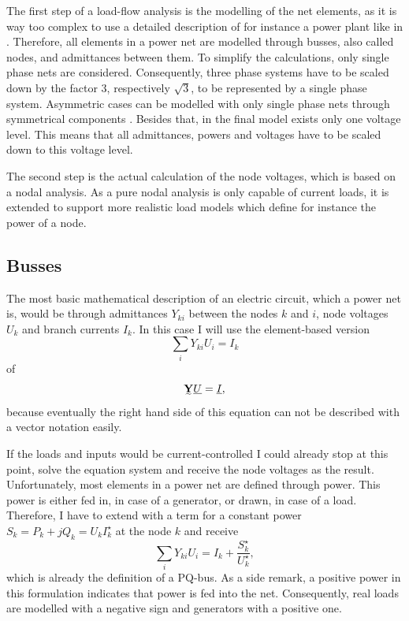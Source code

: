 The first step of a load-flow analysis is the modelling of the net elements, as it is way too complex to use a detailed description of for instance a power plant like in . Therefore, all elements in a power net are modelled through busses, also called nodes, and admittances between them. To simplify the calculations, only single phase nets are considered. Consequently, three phase systems have to be scaled down by the factor 3, respectively $\sqrt{3}$, to be represented by a single phase system. Asymmetric cases can be modelled with only single phase nets through symmetrical components \citep[p. 399]{powerSystemAnalysis}. Besides that, in the final model exists only one voltage level. This means that all admittances, powers and voltages have to be scaled down to this voltage level.

The second step is the actual calculation of the node voltages, which is based on a nodal analysis. As a pure nodal analysis is only capable of current loads, it is extended to support more realistic load models which define for instance the power of a node.

\subsection{Busses}

The most basic mathematical description of an electric circuit, which a power net is, would be through admittances $Y_{ki}$ between the nodes $k$ and $i$, node voltages $U_k$ and branch currents $I_k$. In this case I will use the element-based version
\begin{equation}
	\sum_i Y_{ki} U_i = I_k
	\label{eq:current_controlled}
\end{equation}
of
\begin{equation}
	\mat Y \vec U = \vec I,
\end{equation}
because eventually the right hand side of this equation can not be described with a vector notation easily.

If the loads and inputs would be current-controlled I could already stop at this point, solve the equation system and receive the node voltages as the result. Unfortunately, most elements in a power net are defined through power. This power is either fed in, in case of a generator, or drawn, in case of a load. Therefore, I have to extend  with a term for a constant power $S_k = P_k + j Q_k = U_k I_k^\star$ at the node $k$ and receive
\begin{equation}
	\sum_i Y_{ki} U_i = I_k + \frac{S_k^\star}{U_k^\star},
	\label{eq:pq_bus}
\end{equation}
which is already the definition of a PQ-bus. As a side remark, a positive power in this formulation indicates that power is fed into the net. Consequently, real loads are modelled with a negative sign and generators with a positive one.

